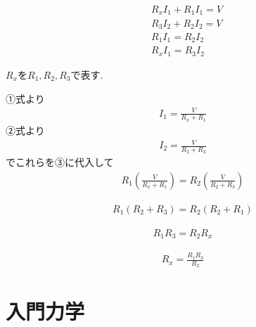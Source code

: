\documentclass[a4paper,12pt]{jlreq}
\begin{document}
\begin{align}
  &R_x I_1 + R_1 I_1  = V\\
  &R_3 I_2 + R_2 I_2 = V\\
  &R_1 I_1 = R_2 I_2\\
  &R_x I_1 = R_3 I_2
\end{align}

$R_x$を$R_1,R_2,R_3$で表す. 

①式より
\begin{align}
  I_1 = \frac{V}{R_x + R_1}
\end{align}
②式より
\begin{align}
  I_2 = \frac{V}{R_2 + R_3}
\end{align}
でこれらを③に代入して
\begin{align}
  R_1 \left(\frac{V}{R_x + R_1}\right) = R_2 \left(\frac{V}{R_2 + R_3}\right)
\end{align}


\begin{align}
  R_1(R_2 + R_3) = R_2(R_2 + R_1)
\end{align}

\begin{align}
  R_1 R_3 = R_2 R_x
\end{align}

\begin{align}
  R_x = \frac{R_1 R_3}{R_2}
\end{align}



\newpage
\section*{入門力学}
\end{document}
